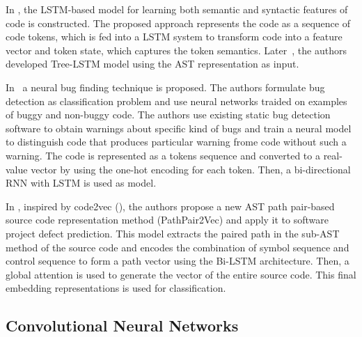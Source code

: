 \documentclass{article}
\begin{document}
In \cite{DamEtAl2018}, the LSTM-based model for learning both semantic and syntactic features of code is constructed. The proposed approach represents the code as a sequence of code tokens, which is fed into a LSTM system to transform code into a feature vector and token state, which captures the token semantics. Later~\cite{DamEtAl2019}, the authors developed Tree-LSTM model using the AST representation as input.

In~\cite{HabibPradel2019} a neural bug finding technique is proposed. The authors formulate bug detection as classification problem
and use neural networks traided on examples of buggy and non-buggy code. 
The authors use existing static bug detection software to obtain warnings about specific kind of bugs and train a neural model
to distinguish code that produces particular warning frome code without such a warning.
The code is represented as a tokens sequence and converted to a real-value vector by using the one-hot encoding for each token.
Then, a bi-directional RNN with LSTM is used as model.

In \cite{ShiEtAl2020}, inspired by code2vec (\cite{AlonEtAl2019vec}), the authors propose a new AST path
 pair-based source code representation method (PathPair2Vec) and apply it to software project defect prediction. 
 This model extracts the paired path in the sub-AST method of the source code and encodes the combination of symbol sequence and control sequence to form a path vector using the Bi-LSTM architecture. Then, a global attention is used to generate the vector of the entire source code. This final embedding representations is used for classification.




\subsection{Convolutional Neural Networks}
\end{document}
